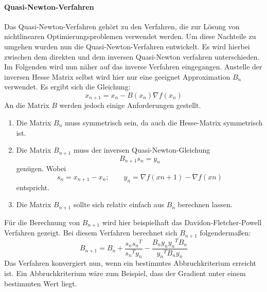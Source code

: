 				\paragraph{Quasi-Newton-Verfahren}
					Das Quasi-Newton-Verfahren gehört zu den Verfahren, die zur Lösung von nichtlinearen Optimierungsproblemen verwendet werden.
					Um diese Nachteile zu umgehen wurden nun die Quasi-Newton-Verfahren entwickelt. Es wird hierbei zwischen dem direkten und dem inversen Quasi-Newton verfahren unterschieden. Im Folgenden wird nun näher auf das inverse Verfahren eingegangen. Anstelle der inversen Hesse Matrix selbst wird hier nur eine geeignet Approximation $B_n$ verwendet. Es ergibt sich die Gleichung: 
					\[ x_{n+1}= x_n - B(x_n)\nabla f(x_n)\]
					An die Matrix $B$ werden jedoch einige Anforderungen gestellt. 					
					\begin{enumerate}
						\item Die Matrix $B_n$ muss symmetrisch sein, da auch die Hesse-Matrix symmetrisch ist.						
						\item Die Matrix $B_{n+1}$ muss der inversen Quasi-Newton-Gleichung
						\[ B_{n+1} s_n = y_n\]
						genügen. Wobei 
						\[ s_{n}= x_{n+1} - x_n; \qquad y_{n}=\nabla f(x{n+1})-\nabla f(x{n})\]
						entspricht.						
						\item Die Matrix $B_{n+1}$ sollte sich relativ einfach aus $B_n$ berechnen lassen.
					\end{enumerate}					
					Für die Berechnung von $B_{n+1}$ wird hier beispielhaft das Davidon-Fletcher-Powell Verfahren gezeigt. Bei diesem Verfahren berechnet sich $B_{n+1}$ folgendermaßen:
					\[ B_{n+1} = B_n + \frac{s_n {s_n}^T}{{s_n}^T y_n}- \frac{B_n y_n {y_n}^T B_n} {{y_n}^T B_n y_n}\]
					Das Verfahren konvergiert nun, wenn ein bestimmtes Abbruchkriterium erreicht ist. Ein Abbruchkriterium wäre zum Beispiel, dass der Gradient unter einem bestimmten Wert liegt.
